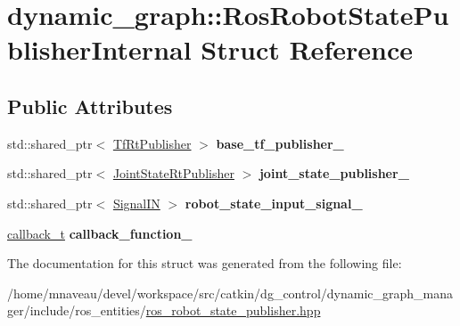 \hypertarget{structdynamic__graph_1_1RosRobotStatePublisherInternal}{}\section{dynamic\+\_\+graph\+:\+:Ros\+Robot\+State\+Publisher\+Internal Struct Reference}
\label{structdynamic__graph_1_1RosRobotStatePublisherInternal}
\subsection*{Public Attributes}
\begin{DoxyCompactItemize}
\item 
std\+::shared\+\_\+ptr$<$ \hyperlink{namespacedynamic__graph_ac8d567b9a3d1ab846ba2efdc1ff1e120}{Tf\+Rt\+Publisher} $>$ {\bfseries base\+\_\+tf\+\_\+publisher\+\_\+}\hypertarget{structdynamic__graph_1_1RosRobotStatePublisherInternal_a99b630f10c0d338da1da2945f7c7f906}{}\label{structdynamic__graph_1_1RosRobotStatePublisherInternal_a99b630f10c0d338da1da2945f7c7f906}

\item 
std\+::shared\+\_\+ptr$<$ \hyperlink{namespacedynamic__graph_ae9ad83c8174a9aa5bc1688df02b4ee95}{Joint\+State\+Rt\+Publisher} $>$ {\bfseries joint\+\_\+state\+\_\+publisher\+\_\+}\hypertarget{structdynamic__graph_1_1RosRobotStatePublisherInternal_ac04f31a05e4c55eb8f28351af8f9cbf6}{}\label{structdynamic__graph_1_1RosRobotStatePublisherInternal_ac04f31a05e4c55eb8f28351af8f9cbf6}

\item 
std\+::shared\+\_\+ptr$<$ \hyperlink{namespacedynamic__graph_ae1463c695a6915ea3f9ab4311beb527a}{Signal\+IN} $>$ {\bfseries robot\+\_\+state\+\_\+input\+\_\+signal\+\_\+}\hypertarget{structdynamic__graph_1_1RosRobotStatePublisherInternal_aacbcfcb6f326e672f555468111af7d56}{}\label{structdynamic__graph_1_1RosRobotStatePublisherInternal_aacbcfcb6f326e672f555468111af7d56}

\item 
\hyperlink{namespacedynamic__graph_adf7d40f2a8d1425af80c14f90e58e961}{callback\+\_\+t} {\bfseries callback\+\_\+function\+\_\+}\hypertarget{structdynamic__graph_1_1RosRobotStatePublisherInternal_a2aa4d44e955ec44e762deb1059b3e3f7}{}\label{structdynamic__graph_1_1RosRobotStatePublisherInternal_a2aa4d44e955ec44e762deb1059b3e3f7}

\end{DoxyCompactItemize}


The documentation for this struct was generated from the following file\+:\begin{DoxyCompactItemize}
\item 
/home/mnaveau/devel/workspace/src/catkin/dg\+\_\+control/dynamic\+\_\+graph\+\_\+manager/include/ros\+\_\+entities/\hyperlink{ros__robot__state__publisher_8hpp}{ros\+\_\+robot\+\_\+state\+\_\+publisher.\+hpp}\end{DoxyCompactItemize}
